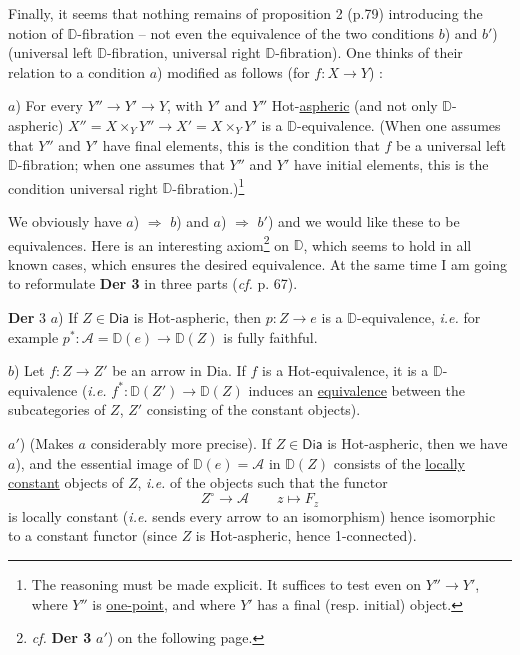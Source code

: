 \documentclass[11pt]{article}
\newcommand{\printedpage}[1]{\marginpar{\footnotesize p.~#1}}
\newcommand{\msp}[1]{\marginpar{\footnotesize [#1]}}
\newcommand{\Hot}{\textsf{Hot}}
\newcommand{\Dia}{\textsf{Dia}}
\newcommand{\DD}{\mathbb{D}}
\begin{document}
\printedpage{59}

\msp{page 96}
Finally, it seems that nothing remains of proposition 2 (p.79) introducing the notion of $\DD$-fibration – not even the equivalence of the two conditions $b$) and $b'$) (universal left $\DD$-fibration, universal right $\DD$-fibration). One thinks of their relation to a condition $a$) modified as follows (for $f : X \to Y$) :

$a$) For every $Y'' \to Y' \to Y$, with $Y'$ and $Y''$ \Hot-\underline{aspheric} (and not only $\DD$-aspheric) $X'' = X \times_Y Y'' \to X' = X \times_Y Y'$ is a $\DD$-equivalence. (When one assumes that $Y''$ and $Y'$ have final elements, this is the condition that $f$ be a universal left $\DD$-fibration; when one assumes that $Y''$ and $Y'$ have initial elements, this is the condition universal right $\DD$-fibration.)\footnote[48]{The reasoning must be made explicit. It suffices to test even on $Y'' \to Y'$, where $Y''$ is \underline{one-point}, and where $Y'$ has a final (resp. initial) object.}

We obviously have $a$) $\Rightarrow$ $b$) and $a$) $\Rightarrow$ $b'$) and we would like these to be equivalences. Here is an interesting axiom\footnote[49]{\textit{cf.} \textbf{Der 3} $a'$) on the following page.} on $\DD$, which seems to hold in all known cases, which ensures the desired equivalence. At the same time I am going to reformulate \textbf{Der 3} in three parts (\textit{cf.} p. 67).

\msp{page 97}
\textbf{Der} 3 $a$) If $Z \in \Dia$ is \Hot-aspheric, then $p : Z \to e$ is a $\DD$-equivalence, \textit{i.e.} for example $p^* : \mathcal{A} = \DD(e) \to \DD(Z)$ is fully faithful.

$b$) Let $f : Z \to Z'$ be an arrow in \Dia. If $f$ is a \Hot-equivalence, it is a $\DD$-equivalence (\textit{i.e.} $f^* : \DD(Z') \to \DD(Z)$ induces an \underline{equivalence} between the subcategories of $Z$, $Z'$ consisting of the constant objects).

$a'$) (Makes $a$ considerably more precise). If $Z \in \Dia$ is \Hot-aspheric, then we have $a$), and the essential image of $\DD(e) = \mathcal{A}$ in $\DD(Z)$ consists of the \underline{locally} \underline{constant} objects of $Z$, \textit{i.e.} of the objects such that the functor
\[
Z^{\circ} \longrightarrow \mathcal{A} \qquad z \longmapsto F_z
\]
is locally constant (\textit{i.e.} sends every arrow to an isomorphism) hence isomorphic to a constant functor (since $Z$ is \Hot-aspheric, hence 1-connected).
\end{document}
